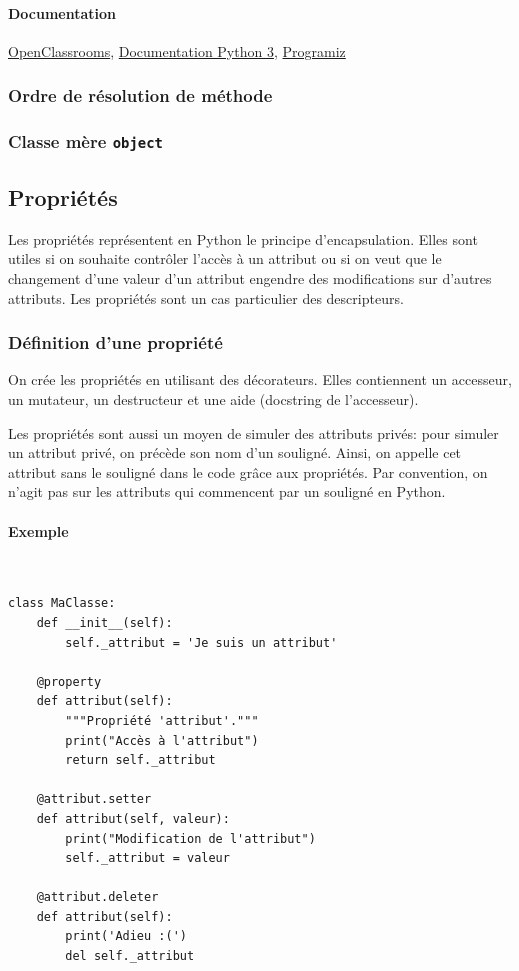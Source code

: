 \documentclass[a4paper, 10pt]{article}
\begin{document}
\paragraph{Documentation} \href{https://openclassrooms.com/courses/apprenez-a-programmer-en-python/l-heritage-9}{OpenClassrooms}, \href{https://docs.python.org/fr/3/tutorial/classes.html?highlight=héritage#inheritance}{Documentation Python 3}, \href{https://www.programiz.com/python-programming/inheritance}{Programiz}


\subsubsection{Ordre de résolution de méthode}

\subsubsection{Classe mère \texttt{object}}


\subsection{Propriétés}
\label{sec:proprietes}
 Les propriétés représentent en Python le principe d'encapsulation. Elles sont utiles si on souhaite contrôler l'accès à un attribut ou si on veut que le changement d'une valeur d'un attribut engendre des modifications sur d'autres attributs. Les propriétés sont un cas particulier des descripteurs.

\subsubsection{Définition d'une propriété}

On crée les propriétés en utilisant des décorateurs. Elles contiennent un accesseur, un mutateur, un destructeur et une aide (docstring de l'accesseur).\bigskip

Les propriétés sont aussi un moyen de simuler des attributs privés: pour simuler un attribut privé, on précède son nom d'un souligné. Ainsi, on appelle cet attribut sans le souligné dans le code grâce aux propriétés. Par convention, on n'agit pas sur les attributs qui commencent par un souligné en Python.

\paragraph{Exemple}~
\begin{verbatim}
class MaClasse:
    def __init__(self):
        self._attribut = 'Je suis un attribut'

    @property
    def attribut(self):
        """Propriété 'attribut'."""
        print("Accès à l'attribut")
        return self._attribut

    @attribut.setter
    def attribut(self, valeur):
        print("Modification de l'attribut")
        self._attribut = valeur

    @attribut.deleter
    def attribut(self):
        print('Adieu :(')
        del self._attribut
\end{verbatim}
\end{document}
